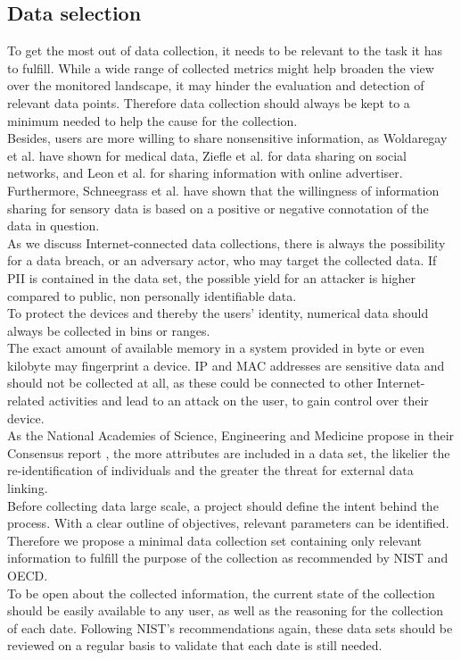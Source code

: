     \subsection{Data selection}
        \label{subsec:software_design:selection}
        To get the most out of data collection, it needs to be relevant to the task it has to fulfill.
        While a wide range of collected metrics might help  broaden the view over the monitored landscape, it may hinder the evaluation and detection of relevant data points. Therefore data collection should always be kept to a minimum needed to help the cause for the collection.\\
        Besides, users are more willing to share nonsensitive information, as Woldaregay et al.   \cite{woldaregay_user_2020} have shown for medical data, Ziefle et al.  \cite{ziefle_users_2016} for data sharing on social networks, and Leon et al.  \cite{leon_what_2013} for sharing information with online advertiser. Furthermore, Schneegrass et al.  \cite{10.1145/3290605.3300753} have shown that the willingness of information sharing for sensory data is based on a positive or negative connotation of the data in question.\\
        
        As we discuss Internet-connected data collections, there is always the possibility for a data breach, or an adversary actor, who may target the collected data. If PII is contained in the data set, the possible yield for an attacker is higher compared to public, non personally identifiable data.\\
        To protect the devices and thereby the users' identity, numerical data should always be collected in bins or ranges.\\
        The exact amount of available memory in a system provided in byte or even kilobyte may fingerprint a device. IP and MAC addresses are sensitive data and should not be collected at all, as these could be connected to other Internet-related activities and lead to an attack on the user, to gain control over their device. \\
        As the National Academies of Science, Engineering and Medicine propose in their Consensus report \cite{groves_federal_2017}, the more attributes are included in a data set, the likelier the re-identification of individuals and the greater the threat for external data linking.\\
        
        Before collecting data large scale, a project should define the intent behind the process. With a clear outline of objectives, relevant parameters can be identified. 
        Therefore we propose a minimal data collection set containing only relevant information to fulfill the purpose of the collection as recommended by NIST and OECD.\\
        To be open about the collected information, the current state of the collection should be easily available to any user, as well as the reasoning for the collection of each date.
        Following NIST's recommendations again, these data sets should be reviewed on a regular basis to validate that each date is still needed.\\
        
